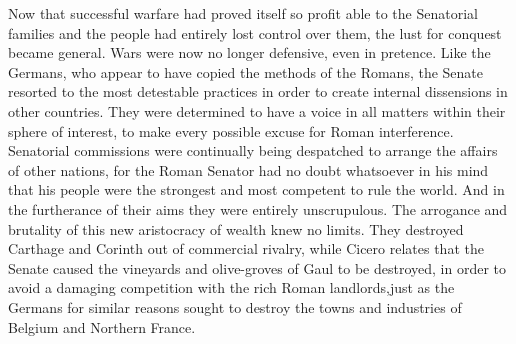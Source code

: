 \documentclass{book}
\begin{document}
Now that successful warfare had proved itself so profit able to the Senatorial families and the people had entirely lost control over them, the lust for conquest became general. Wars were now no longer defensive, even in pretence. Like the Germans, who appear to have copied the methods of the Romans, the Senate resorted to the most detestable practices in order to create internal dissensions in other countries. They were determined to have a voice in all matters within their sphere of interest, to make every possible excuse for Roman interference. Senatorial commissions were continually being despatched to arrange the affairs of other nations, for the Roman Senator had no doubt whatsoever in his mind that his people were the strongest and most competent to rule the world. And in the furtherance of their aims they were entirely unscrupulous. The arrogance and brutality of this new aristocracy of wealth knew no limits. They destroyed Carthage and Corinth out of commercial rivalry, while Cicero relates that the Senate caused the vineyards and olive-groves of Gaul to be destroyed, in order to avoid a damaging competition with the rich Roman landlords,\footnotemark[5] just as the Germans for similar reasons sought to destroy the towns and industries of Belgium and Northern France.
\end{document}

